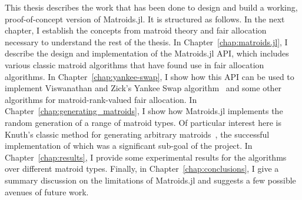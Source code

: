This thesis describes the work that has been done to design and build a working, proof-of-concept version of Matroids.jl. It is structured as follows. In the next chapter, I establish the concepts from matroid theory and fair allocation necessary to understand the rest of the thesis. In Chapter~\ref{chap:matroids.jl}, I describe the design and implementation of the Matroids.jl API, which includes various classic matroid algorithms that have found use in fair allocation algorithms. In Chapter~\ref{chap:yankee-swap}, I show how this API can be used to implement Viswanathan and Zick's Yankee Swap algorithm~\cite{viswanathan2023yankee} and some other algorithms for matroid-rank-valued fair allocation. In Chapter~\ref{chap:generating_matroids}, I show how Matroids.jl implements the random generation of a range of matroid types. Of particular interest here is Knuth's classic method for generating arbitrary matroids~\cite{knuth-1975}, the successful implementation of which was a significant sub-goal of the project. In Chapter~\ref{chap:results}, I provide some experimental results for the algorithms over different matroid types. Finally, in Chapter~\ref{chap:conclusions}, I give a summary discussion on the limitations of Matroids.jl and suggests a few possible avenues of future work.

